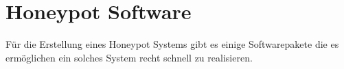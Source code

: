 \section{Honeypot Software}
Für die Erstellung eines Honeypot Systems gibt es einige Softwarepakete die es ermöglichen ein solches System recht schnell zu realisieren.




